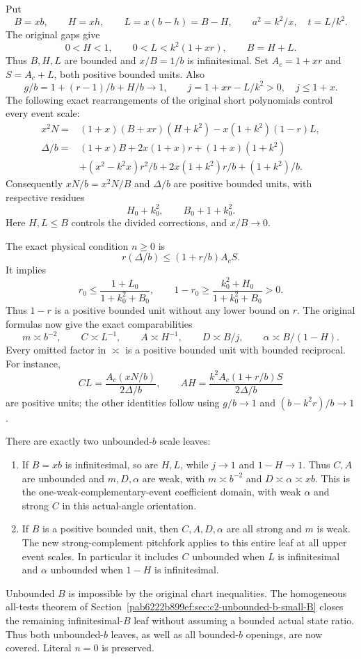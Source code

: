 Put
\[
 B=xb,\qquad H=xh,\qquad L=x(b-h)=B-H,\qquad
 a^2=k^2/x,\quad t=L/k^2.
\]
The original gaps give
\[
 0<H<1,\qquad0<L<k^2(1+xr),\qquad B=H+L.
\]
Thus $B,H,L$ are bounded and $x/B=1/b$ is infinitesimal.
Set $A_c=1+xr$ and $S=A_c+L$, both positive bounded units. Also
\[
 g/b=1+(r-1)/b+H/b\longrightarrow1,
 \qquad j=1+xr-L/k^2>0,\quad j\le1+x.
\]
The following exact rearrangements of the original short polynomials
control every event scale:
\begin{align*}
 x^2N={}&(1+x)(B+xr)(H+k^2)-x(1+k^2)(1-r)L,\\
 \Delta/b={}&(1+x)B+2x(1+x)r+(1+x)(1+k^2)\\
 &+(x^2-k^2x)r^2/b+2x(1+k^2)r/b+(1+k^2)/b.
\end{align*}
Consequently $xN/b=x^2N/B$ and $\Delta/b$ are positive bounded
units, with respective residues
\[
 H_0+k_0^2,\qquad B_0+1+k_0^2.
\]
Here $H,L\le B$ controls the divided corrections, and $x/B\to0$.

The exact physical condition $n\ge0$ is
\[
 r(\Delta/b)\le(1+r/b)A_cS.
\]
It implies
\[
 r_0\le\frac{1+L_0}{1+k_0^2+B_0},\qquad
 1-r_0\ge\frac{k_0^2+H_0}{1+k_0^2+B_0}>0.
\]
Thus $1-r$ is a positive bounded unit without any lower bound on $r$.
The original formulas now give the exact comparabilities
\[
 m\asymp b^{-2},\qquad C\asymp L^{-1},\qquad A\asymp H^{-1},
 \qquad D\asymp B/j,\qquad\alpha\asymp B/(1-H).
 \tag{SR1}
\]
Every omitted factor in $\asymp$ is a positive bounded unit with
bounded reciprocal. For instance,
\[
 CL=\frac{A_c(xN/b)}{2\Delta/b},\qquad
 AH=\frac{k^2A_c(1+r/b)S}{2\Delta/b}
\]
are positive units; the other identities follow using $g/b\to1$
and $(b-k^2r)/b\to1$.

There are exactly two unbounded-$b$ scale leaves:
\begin{enumerate}
\item If $B=xb$ is infinitesimal, so are $H,L$, while $j\to1$
and $1-H\to1$. Thus $C,A$ are unbounded and $m,D,\alpha$ are
weak, with $m\asymp b^{-2}$ and $D\asymp\alpha\asymp xb$.
This is the one-weak-complementary-event coefficient domain, with weak
$\alpha$ and strong $C$ in this actual-angle orientation.
\item If $B$ is a positive bounded unit, then $C,A,D,\alpha$
are all strong and $m$ is weak. The new strong-complement pitchfork
applies to this entire leaf at all upper event scales. In particular
it includes $C$ unbounded when $L$ is infinitesimal and $\alpha$
unbounded when $1-H$ is infinitesimal.
\end{enumerate}
Unbounded $B$ is impossible by the original chart inequalities.
The homogeneous all-tests theorem of Section~\ref{pab6222b899ef:sec:c2-unbounded-b-small-B}
closes the remaining infinitesimal-$B$ leaf without assuming a bounded
actual state ratio. Thus both unbounded-$b$ leaves, as well as all
bounded-$b$ openings, are now covered. Literal $n=0$ is preserved.

